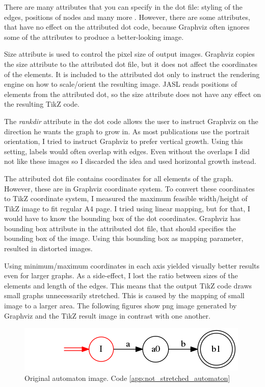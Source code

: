 \documentclass{ctuthesis}
\begin{document}
There are many attributes that you can specify in the dot file: styling of the edges, positions of nodes and many more \cite{dot-notation}. However, there are some attributes, that have no effect on the attributed dot code, because Graphviz often ignores some of the attributes to produce a better-looking image. 

Size attribute is used to control the pixel size of output images. Graphviz copies the size attribute to the attributed dot file, but it does not affect the coordinates of the elements. It is included to the attributed dot only to instruct the rendering engine on how to scale/orient the resulting image. JASL reads positions of elements from the attributed dot, so the size attribute does not have any effect on the resulting TikZ code.

The \textit{rankdir} attribute in the dot code allows the user to instruct Graphviz on the direction he wants the graph to grow in. As most publications use the portrait orientation, I tried to instruct Graphviz to prefer vertical growth. Using this setting, labels would often overlap with edges. Even without the overlaps I did not like these images so I discarded the idea and used horizontal growth instead. 

The attributed dot file contains coordinates for all elements of the graph. However, these are in Graphviz coordinate system. To convert these coordinates to TikZ coordinate system, I measured the maximum feasible width/height of TikZ image to fit regular A4 page. I tried using linear mapping, but for that, I would have to know the bounding box of the dot coordinates. Graphviz has bounding box attribute in the attributed dot file, that should specifies the bounding box of the image. Using this bounding box as mapping parameter, resulted in distorted images.  

Using minimum/maximum coordinates in each axis yielded visually better results even for larger graphs. As a side-effect, I lost the ratio between sizes of the elements and length of the edges. This means that the output TikZ code draws small graphs unnecessarily stretched. This is caused by the mapping of small image to a larger area. The following figures show png image generated by Graphviz and the TikZ result image in contrast with one another. 

\begin{figure}[H]
\includegraphics[width=0.5\linewidth]{figures/not_stretched.png}
\caption{Original automaton image. Code \ref{app:not_stretched_automaton}}
\label{fig:not_stretched_automaton}
\end{figure}
\end{document}
